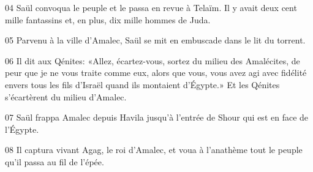 
04 Saül convoqua le peuple et le passa en revue à Telaïm. Il y avait deux cent mille fantassins et, en plus, dix mille hommes de Juda.

05 Parvenu à la ville d’Amalec, Saül se mit en embuscade dans le lit du torrent.

06 Il dit aux Qénites: «Allez, écartez-vous, sortez du milieu des Amalécites, de peur que je ne vous traite comme eux, alors que vous, vous avez agi avec fidélité envers tous les fils d’Israël quand ils montaient d’Égypte.» Et les Qénites s’écartèrent du milieu d’Amalec.

07 Saül frappa Amalec depuis Havila jusqu’à l’entrée de Shour qui est en face de l’Égypte.


08 Il captura vivant Agag, le roi d’Amalec, et voua à l’anathème tout le peuple qu’il passa au fil de l’épée.

